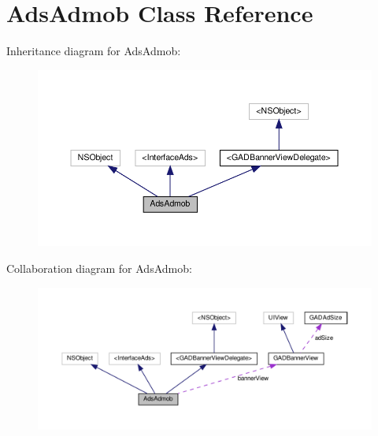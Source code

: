 \hypertarget{interfaceAdsAdmob}{}\section{Ads\+Admob Class Reference}
\label{interfaceAdsAdmob}


Inheritance diagram for Ads\+Admob\+:
\nopagebreak
\begin{figure}[H]
\begin{center}
\leavevmode
\includegraphics[width=350pt]{interfaceAdsAdmob__inherit__graph}
\end{center}
\end{figure}


Collaboration diagram for Ads\+Admob\+:
\nopagebreak
\begin{figure}[H]
\begin{center}
\leavevmode
\includegraphics[width=350pt]{interfaceAdsAdmob__coll__graph}
\end{center}
\end{figure}

